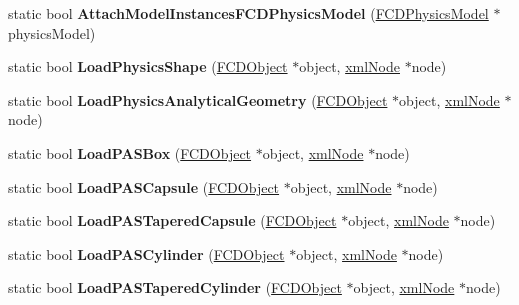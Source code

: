 \begin{DoxyCompactItemize}
\item 
\hypertarget{classFArchiveXML_a984772ce7a60a0d21642939bd1421078}{
static bool {\bfseries AttachModelInstancesFCDPhysicsModel} (\hyperlink{classFCDPhysicsModel}{FCDPhysicsModel} $\ast$physicsModel)}
\label{classFArchiveXML_a984772ce7a60a0d21642939bd1421078}

\item 
\hypertarget{classFArchiveXML_a64acef1ffd5aba18564d2c7b9b870376}{
static bool {\bfseries LoadPhysicsShape} (\hyperlink{classFCDObject}{FCDObject} $\ast$object, \hyperlink{struct__xmlNode}{xmlNode} $\ast$node)}
\label{classFArchiveXML_a64acef1ffd5aba18564d2c7b9b870376}

\item 
\hypertarget{classFArchiveXML_ae46a2616d1919f184268991daa937d95}{
static bool {\bfseries LoadPhysicsAnalyticalGeometry} (\hyperlink{classFCDObject}{FCDObject} $\ast$object, \hyperlink{struct__xmlNode}{xmlNode} $\ast$node)}
\label{classFArchiveXML_ae46a2616d1919f184268991daa937d95}

\item 
\hypertarget{classFArchiveXML_af63374014ddf15b1dd31975596f1ced3}{
static bool {\bfseries LoadPASBox} (\hyperlink{classFCDObject}{FCDObject} $\ast$object, \hyperlink{struct__xmlNode}{xmlNode} $\ast$node)}
\label{classFArchiveXML_af63374014ddf15b1dd31975596f1ced3}

\item 
\hypertarget{classFArchiveXML_a223c29850e37f72af05c3d66dc28a978}{
static bool {\bfseries LoadPASCapsule} (\hyperlink{classFCDObject}{FCDObject} $\ast$object, \hyperlink{struct__xmlNode}{xmlNode} $\ast$node)}
\label{classFArchiveXML_a223c29850e37f72af05c3d66dc28a978}

\item 
\hypertarget{classFArchiveXML_aabd1fd0875ffaf8ef6fb0689d37e81cf}{
static bool {\bfseries LoadPASTaperedCapsule} (\hyperlink{classFCDObject}{FCDObject} $\ast$object, \hyperlink{struct__xmlNode}{xmlNode} $\ast$node)}
\label{classFArchiveXML_aabd1fd0875ffaf8ef6fb0689d37e81cf}

\item 
\hypertarget{classFArchiveXML_a590ab8128ebf104f25968fc1c76dcda1}{
static bool {\bfseries LoadPASCylinder} (\hyperlink{classFCDObject}{FCDObject} $\ast$object, \hyperlink{struct__xmlNode}{xmlNode} $\ast$node)}
\label{classFArchiveXML_a590ab8128ebf104f25968fc1c76dcda1}

\item 
\hypertarget{classFArchiveXML_ae33494b0714790692fdcc31195bb64c0}{
static bool {\bfseries LoadPASTaperedCylinder} (\hyperlink{classFCDObject}{FCDObject} $\ast$object, \hyperlink{struct__xmlNode}{xmlNode} $\ast$node)}
\label{classFArchiveXML_ae33494b0714790692fdcc31195bb64c0}


\end{DoxyCompactItemize}
